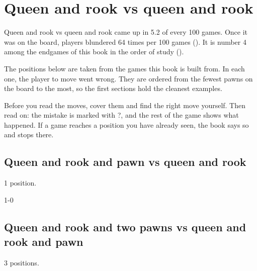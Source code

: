 \chapter{Queen and rook vs queen and rook}\label{ch:queen-and-rook-vs-queen-and-rook}
Queen and rook vs queen and rook came up in 5.2 of every 100 games. Once it was on the board, players blundered 64 times per 100 games (). It is number 4 among the endgames of this book in the order of study ().

The positions below are taken from the games this book is built from. In each one, the player to move went wrong. They are ordered from the fewest pawns on the board to the most, so the first sections hold the cleanest examples.

Before you read the moves, cover them and find the right move yourself. Then read on: the mistake is marked with ?, and the rest of the game shows what happened. If a game reaches a position you have already seen, the book says so and stops there.


\section{Queen and rook and pawn vs queen and rook}
1 position.


1-0\par
\section{Queen and rook and two pawns vs queen and rook and pawn}
3 positions.



